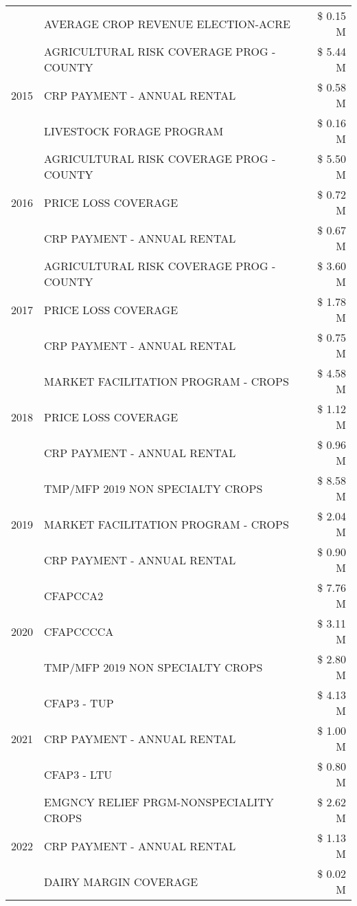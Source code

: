 \begin{tabular}{llr}
 & AVERAGE CROP REVENUE ELECTION-ACRE & \$ 0.15 M \\
\cline{1-3}
\multirow[t]{3}{*}{2015} & AGRICULTURAL RISK COVERAGE PROG - COUNTY & \$ 5.44 M \\
 & CRP PAYMENT - ANNUAL RENTAL & \$ 0.58 M \\
 & LIVESTOCK FORAGE PROGRAM & \$ 0.16 M \\
\cline{1-3}
\multirow[t]{3}{*}{2016} & AGRICULTURAL RISK COVERAGE PROG - COUNTY & \$ 5.50 M \\
 & PRICE LOSS COVERAGE & \$ 0.72 M \\
 & CRP PAYMENT - ANNUAL RENTAL & \$ 0.67 M \\
\cline{1-3}
\multirow[t]{3}{*}{2017} & AGRICULTURAL RISK COVERAGE PROG - COUNTY & \$ 3.60 M \\
 & PRICE LOSS COVERAGE & \$ 1.78 M \\
 & CRP PAYMENT - ANNUAL RENTAL & \$ 0.75 M \\
\cline{1-3}
\multirow[t]{3}{*}{2018} & MARKET FACILITATION PROGRAM - CROPS & \$ 4.58 M \\
 & PRICE LOSS COVERAGE & \$ 1.12 M \\
 & CRP PAYMENT - ANNUAL RENTAL & \$ 0.96 M \\
\cline{1-3}
\multirow[t]{3}{*}{2019} & TMP/MFP 2019 NON SPECIALTY CROPS & \$ 8.58 M \\
 & MARKET FACILITATION PROGRAM - CROPS & \$ 2.04 M \\
 & CRP PAYMENT - ANNUAL RENTAL & \$ 0.90 M \\
\cline{1-3}
\multirow[t]{3}{*}{2020} & CFAPCCA2 & \$ 7.76 M \\
 & CFAPCCCCA & \$ 3.11 M \\
 & TMP/MFP 2019 NON SPECIALTY CROPS & \$ 2.80 M \\
\cline{1-3}
\multirow[t]{3}{*}{2021} & CFAP3 - TUP & \$ 4.13 M \\
 & CRP PAYMENT - ANNUAL RENTAL & \$ 1.00 M \\
 & CFAP3 - LTU & \$ 0.80 M \\
\cline{1-3}
\multirow[t]{3}{*}{2022} & EMGNCY RELIEF PRGM-NONSPECIALITY CROPS & \$ 2.62 M \\
 & CRP PAYMENT - ANNUAL RENTAL & \$ 1.13 M \\
 & DAIRY MARGIN COVERAGE & \$ 0.02 M \\
\cline{1-3}
\bottomrule
\end{tabular}
